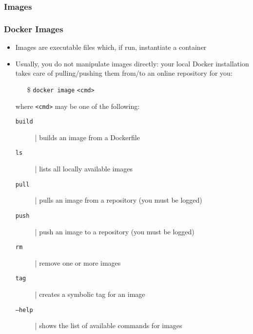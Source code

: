 \documentclass{beamer}\mode<presentation>{\usetheme{AMSBolognaFC}}
\begin{document}
\subsubsection{Images}

\begin{frame}
\frametitle[Docker Images]{Docker Images}

\begin{itemize}
	\item Images are executable files which, if run, instantiate a container
	\item Usually, you do not manipulate images directly: your local Docker installation takes care of pulling/pushing them from/to an online \alert{repository} for you:
	\begin{itemize}
		\item[\$] \texttt{docker image} \texttt{\alert{<cmd>}}
	\end{itemize}
	where \texttt{<cmd>} may be one of the following:
	\begin{description}
		\item[\texttt{build}] | builds an image from a \alert{Dockerfile}
		\item[\texttt{ls}] | lists all locally available images
		\item[\texttt{pull}] | pulls an image from a \alert{repository} (you must be logged)
		\item[\texttt{push}] | push an image to a \alert{repository} (you must be logged)
		\item[\texttt{rm}] | remove one or more images
		\item[\texttt{tag}] | creates a symbolic tag for an image
		\item[\texttt{--help}] | shows the list of available commands for images

	\end{description}

\end{itemize}

\end{frame}
\end{document}

